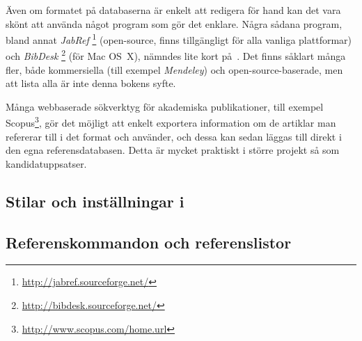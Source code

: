 \documentclass[lang=sv,ptsize=10pt,font=none,nomath,titles=bf,../../a4.tex]{subfiles}
\begin{document}
Även om formatet på databaserna är enkelt att redigera för hand kan det
vara skönt att använda något program som gör det enklare. Några sådana
program, bland annat \emph{JabRef}%
\footnote{\url{http://jabref.sourceforge.net/}} (open-source, finns 
tillgängligt för alla vanliga plattformar) och \emph{BibDesk}%
\footnote{\url{http://bibdesk.sourceforge.net/}} (för Mac OS~X), nämndes
lite kort på~. Det finns såklart många fler, både
kommersiella (till exempel \emph{Mendeley}) och open-source-baserade, 
men att lista alla är inte denna bokens syfte.

Många webbaserade sökverktyg för akademiska publikationer, till exempel
Scopus\footnote{\url{http://www.scopus.com/home.url}}, gör det möjligt att
enkelt exportera information om de artiklar man refererar till i det
format \BibTeX{} och  använder, och dessa kan sedan
läggas till direkt i den egna referensdatabasen.
Detta är mycket praktiskt i större projekt så som kandidatuppsatser.

\subsection{Stilar och inställningar i }
\subsection{Referenskommandon och referenslistor}
\end{document}
